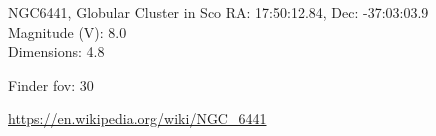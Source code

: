 \begin{block}{NGC6441, Globular Cluster in Sco}
    RA: 17:50:12.84, Dec: -37:03:03.9 \\ 
    Magnitude (V): 8.0 \\ 
    Dimensions: 4.8 

    Finder fov: 30 

    \url{https://en.wikipedia.org/wiki/NGC_6441} 
\end{block}